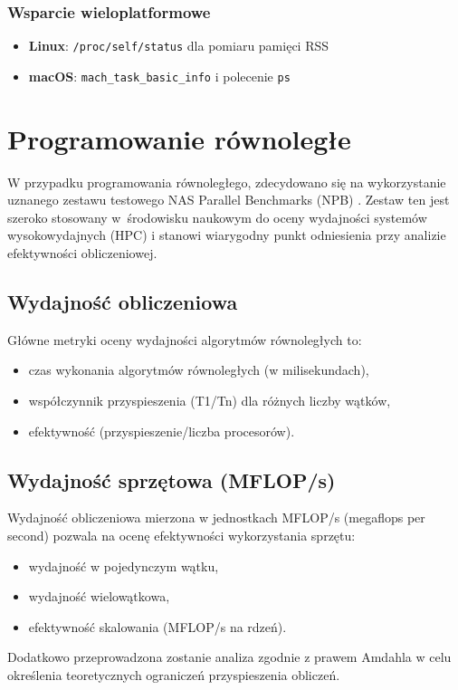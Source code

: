 \subsubsection{Wsparcie wieloplatformowe}
\begin{itemize}
    \item \textbf{Linux}: \texttt{/proc/self/status} dla pomiaru pamięci RSS
    \item \textbf{macOS}: \texttt{mach\_task\_basic\_info} i polecenie \texttt{ps}
\end{itemize}

\section{Programowanie równoległe}
W przypadku programowania równoległego, zdecydowano się na wykorzystanie uznanego zestawu testowego NAS Parallel Benchmarks (NPB) \cite{nasaParallelBenchmarks}. Zestaw ten jest szeroko stosowany w~środowisku naukowym do oceny wydajności systemów wysokowydajnych (HPC) i stanowi wiarygodny punkt odniesienia przy analizie efektywności obliczeniowej.
\subsection{Wydajność obliczeniowa}
Główne metryki oceny wydajności algorytmów równoległych to:
\begin{itemize}
\item czas wykonania algorytmów równoległych (w milisekundach),
\item współczynnik przyspieszenia (T1/Tn) dla różnych liczby wątków,
\item efektywność (przyspieszenie/liczba procesorów).
\end{itemize}

\subsection{Wydajność sprzętowa (MFLOP/s)}
Wydajność obliczeniowa mierzona w jednostkach MFLOP/s (megaflops per second) pozwala na ocenę efektywności wykorzystania sprzętu:
\begin{itemize}
\item wydajność w pojedynczym wątku,
\item wydajność wielowątkowa,
\item efektywność skalowania (MFLOP/s na rdzeń).
\end{itemize}
Dodatkowo przeprowadzona zostanie analiza zgodnie z prawem Amdahla w celu określenia teoretycznych ograniczeń przyspieszenia obliczeń.

